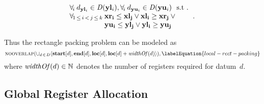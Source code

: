 \begin{definition}
\begin{displaymath}
\begin{array}{c}
{\begin{array}{@{}l@{}}
                       \forall_{\! i} \: d_{\mVar{yl}_i} \in \mDomain(\mVar{yl}_i),
                       \forall_{\! i} \: d_{\mVar{yu}_i} \in \mDomain(\mVar{yu}_i)
                       \text{ \st} \\
                       \begin{array}{@{}r@{\:}l@{}}
                           \forall_{\! 1 \,\leq\, i \,<\, j \,\leq\, k}
                         & \mVar{xr_i} \leq \mVar{xl_j} \mOr
                           \mVar{xl_i} \geq \mVar{xr_j} \mOr \mbox{} \\
                         & \mVar{yu_i} \leq \mVar{yl_j} \mOr
                           \mVar{yl_i} \geq \mVar{yu_j}
                       \end{array}
                     \end{array}
                   }\!.
    \end{array}
  \end{displaymath}
\end{definition}
%
Thus the rectangle packing problem can be modeled as
%
\begin{equation}
  \mNoOverlap\!
  \left(
    \cup_{d \,\in\, \mDataSet}
      \mTuple{
         \mVar{start}[d],
         \mVar{end}[d],
         \mVar{loc}[d],
         \mVar{loc}[d] + \mWidthOf(d)
      }
  \right)\!,
  \labelEquation{local-rect-packing}
\end{equation}
%
where \mbox{$\operatorname{\textrm{\textit{widthOf}}}(d) \in \mathbb{N}$} denotes the number of
\glspl{register} required for \gls{datum}~$d$\hspace{-1pt}.


\subsection{Global Register Allocation}


